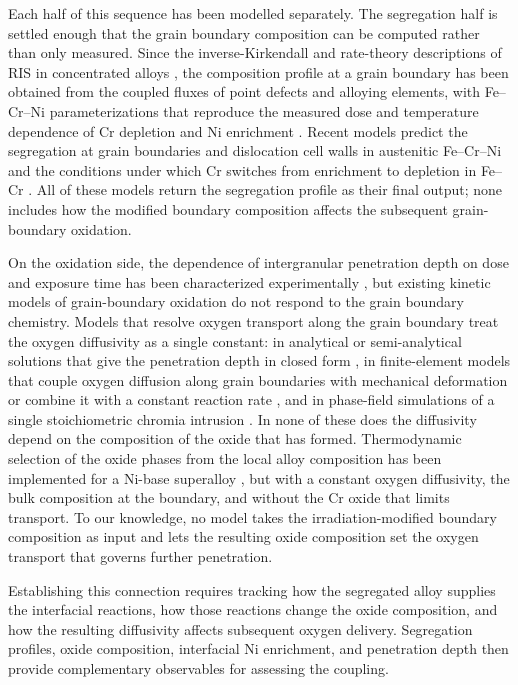 \documentclass[3p,times,nonatbib]{elsarticle} %
\begin{document}
Each half of this sequence has been modelled separately. The segregation half is settled enough
that the grain boundary composition can be computed rather than only measured.
Since the inverse-Kirkendall and rate-theory descriptions of RIS in
concentrated alloys \cite{marwick1978segregation,wiedersich1979theory},
the composition profile at a grain boundary has been obtained from the
coupled fluxes of point defects and alloying elements, with Fe--Cr--Ni
parameterizations that reproduce the measured dose and temperature
dependence of Cr depletion and Ni enrichment
\cite{allen1998modeling}. Recent models predict the
segregation at grain boundaries and dislocation cell walls in austenitic
Fe--Cr--Ni \cite{kadambi2025phasefield} and the conditions under which
Cr switches from enrichment to depletion in Fe--Cr
\cite{oplinger2026radiationinduceda}. All of these models return the segregation profile as their final output;
none includes how the modified boundary composition affects the subsequent
grain-boundary oxidation.

On the oxidation side, the dependence of intergranular penetration depth
on dose and exposure time has been characterized
experimentally \cite{deng2017effect,deng2020corrosion}, but existing
kinetic models of grain-boundary oxidation do not respond to the grain boundary
chemistry. Models that resolve oxygen transport along the grain boundary treat
the oxygen diffusivity as a single constant: in analytical or
semi-analytical solutions that give the penetration depth in closed form
\cite{xu2015modeling,evans2013mechanism}, in
finite-element models that couple oxygen diffusion along grain boundaries
with mechanical deformation \cite{zhao2011modeling,karabela2013oxygen}
or combine it with a constant reaction rate \cite{aoyagi2012crystal},
and in phase-field simulations of a single
stoichiometric chromia intrusion
\cite{rancourt2025viscoplasticity}. In none of
these does the diffusivity depend on the composition of the oxide that has
formed. Thermodynamic selection of the
oxide phases from the local alloy composition has been implemented for a
Ni-base superalloy \cite{fang2022numerical}, but with a constant
oxygen diffusivity, the bulk composition at the boundary, and without the
Cr oxide that limits transport. To our knowledge, no model takes the
irradiation-modified boundary composition as input and lets the resulting
oxide composition set the oxygen transport that governs further penetration.

Establishing this connection requires tracking how the segregated
alloy supplies the interfacial reactions, how those reactions change the
oxide composition, and how the resulting diffusivity affects subsequent oxygen
delivery. Segregation profiles, oxide composition, interfacial Ni
enrichment, and penetration depth then provide complementary observables
for assessing the coupling.
\end{document}
